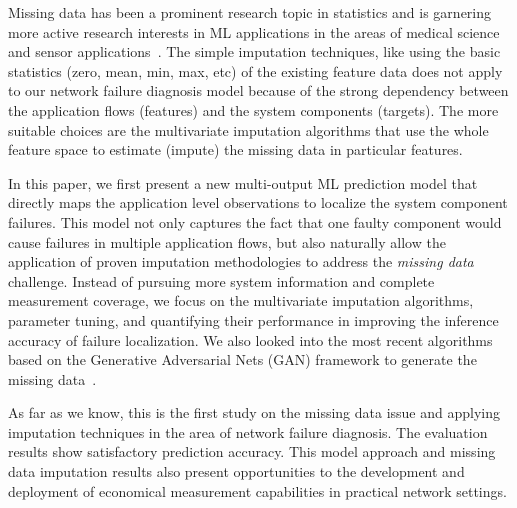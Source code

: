 Missing data has been a prominent research topic in statistics and is garnering more active research interests
 in ML applications in the areas of medical science~\cite{DONDERS20061087} and sensor applications~\cite{missingdata:sensor:20}.
 The simple imputation techniques, like using the basic statistics (zero, mean, min, max, etc) of the existing feature data does 
not apply to our network failure diagnosis model because of the strong dependency between the application flows (features) and the system components (targets).   
The more suitable choices are the multivariate imputation algorithms that use the whole feature space to estimate (impute) the missing data in particular features.

In this paper, we first present a new multi-output ML prediction model that directly maps the application level observations to localize the system component failures. 
This model not only captures the fact that one faulty component would cause failures in multiple application flows, but also naturally allow the application of 
proven imputation methodologies to address the {\it missing data} challenge. Instead of pursuing more system information and complete measurement coverage, 
we focus on the multivariate imputation algorithms, parameter tuning, and quantifying their performance in improving the inference accuracy of failure localization.  
We also looked into the most recent algorithms based on the Generative Adversarial Nets (GAN) framework to generate the 
missing data~\cite{Yoon2018GAINMD,Awan2021ImputationOM}.

As far as we know, this is the first study on the missing data issue and applying imputation techniques in the area of network failure diagnosis. The evaluation results 
show satisfactory prediction accuracy. This model approach and missing data imputation results also present opportunities to the development and deployment of 
economical measurement capabilities in practical network settings.     









